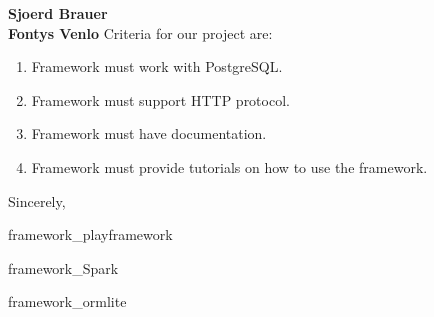 \documentclass[11pt]{letter} %
\begin{document}
\begin{letter}{\large \bfseries Sjoerd Brauer\\ Fontys Venlo }
		Criteria for our project are:
		\begin{enumerate}
			\item Framework must work with PostgreSQL.
			\item Framework must support HTTP protocol.
			\item Framework must have documentation.
			\item Framework must provide tutorials on how to use the framework.
		\end{enumerate}
	
		\closing{Sincerely,}
		
		
		
		
		
		 {framework_playframework}
		
		 {framework_Spark}
		
		
		 {framework_ormlite}
		
		







	

		
		
		
		
		
		
	\end{letter}
	
\end{document}

